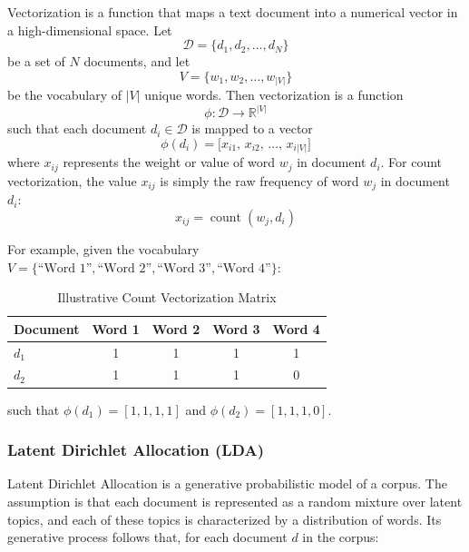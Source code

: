 \documentclass[12pt,a4paper]{report}
\begin{document}
Vectorization is a function that maps a text document into a numerical vector
in a high-dimensional space. Let
\[
  \mathcal{D} = \{d_1, d_2, \dots, d_N\}
\]
be a set of $N$ documents, and let
\[
  V = \{w_1, w_2, \dots, w_{|V|}\}
\]
be the vocabulary of $|V|$ unique words. Then vectorization is a function
\begin{equation}
  \phi : \mathcal{D} \longrightarrow \mathbb{R}^{|V|}
  \label{eq:vecmap}
\end{equation}
such that each document $d_i \in \mathcal{D}$ is mapped to a vector
\begin{equation}
  \phi(d_i) = \bigl[x_{i1},\, x_{i2},\, \dots,\, x_{i|V|}\bigr]
  \label{eq:vecdoc}
\end{equation}
where $x_{ij}$ represents the weight or value of word $w_j$ in document $d_i$.
For count vectorization, the value $x_{ij}$ is simply the raw frequency of word
$w_j$ in document $d_i$:
\begin{equation}
  x_{ij} = \operatorname{count}(w_j, d_i)
  \label{eq:countvec}
\end{equation}

\noindent For example, given the vocabulary
$V = \{\text{``Word 1''}, \text{``Word 2''}, \text{``Word 3''},
\text{``Word 4''}\}$:

\begin{table}[htbp]
  \centering
  \caption{Illustrative Count Vectorization Matrix}
  \label{tab:countvec}
  \begin{tabular}{lcccc}
    \toprule
    \textbf{Document} & \textbf{Word 1} & \textbf{Word 2} & \textbf{Word 3} & \textbf{Word 4} \\
    \midrule
    $d_1$ & 1 & 1 & 1 & 1 \\
    $d_2$ & 1 & 1 & 1 & 0 \\
    \bottomrule
  \end{tabular}
\end{table}

\noindent such that $\phi(d_1) = [1,1,1,1]$ and $\phi(d_2) = [1,1,1,0]$.

\subsubsection{Latent Dirichlet Allocation (LDA)}

Latent Dirichlet Allocation is a generative probabilistic model of a corpus. The
assumption is that each document is represented as a random mixture over
latent topics, and each of these topics is characterized by a distribution of
words. Its generative process follows that, for each document $d$ in the
corpus:
\end{document}
